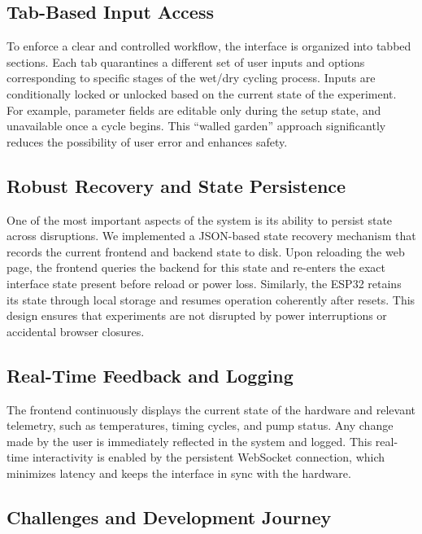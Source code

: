 \documentclass[12pt]{article}
\begin{document}
            \subsection{Tab-Based Input Access}
            
            To enforce a clear and controlled workflow, the interface is organized into tabbed sections. Each tab quarantines a different set of user inputs and options corresponding to specific stages of the wet/dry cycling process. Inputs are conditionally locked or unlocked based on the current state of the experiment. For example, parameter fields are editable only during the setup state, and unavailable once a cycle begins. This “walled garden” approach significantly reduces the possibility of user error and enhances safety.
            
            \subsection{Robust Recovery and State Persistence}
            
            One of the most important aspects of the system is its ability to persist state across disruptions. We implemented a JSON-based state recovery mechanism that records the current frontend and backend state to disk. Upon reloading the web page, the frontend queries the backend for this state and re-enters the exact interface state present before reload or power loss. Similarly, the ESP32 retains its state through local storage and resumes operation coherently after resets. This design ensures that experiments are not disrupted by power interruptions or accidental browser closures.
            
            \subsection{Real-Time Feedback and Logging}
            
            The frontend continuously displays the current state of the hardware and relevant telemetry, such as temperatures, timing cycles, and pump status. Any change made by the user is immediately reflected in the system and logged. This real-time interactivity is enabled by the persistent WebSocket connection, which minimizes latency and keeps the interface in sync with the hardware.
            
            \subsection{Challenges and Development Journey}
            
\end{document}
